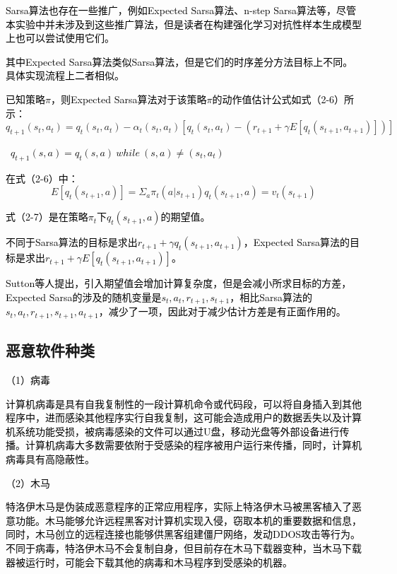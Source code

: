 \textcolor{black}{Sarsa算法也存在一些推广，例如Expected Sarsa算法、n-step Sarsa算法等，尽管本实验中并未涉及到这些推广算法，但是读者在构建强化学习对抗性样本生成模型上也可以尝试使用它们。}

\textcolor{black}{其中Expected Sarsa算法类似Sarsa算法，但是它们的时序差分方法目标上不同。具体实现流程上二者相似。}

\textcolor{black}{已知策略$\pi$，则Expected Sarsa算法对于该策略$\pi$的动作值估计公式如式（2-6）所示：}
\begin{equation}
q_{t+1}(s_{t},a_{t})=q_{t}(s_{t},a_{t})-\alpha _{t}(s_{t},a_{t})[q_{t}(s_{t},a_{t})-(r_{t+1}+\gamma E[q_{t}(s_{t+1},a_{t+1})])] 
\end{equation}

\textcolor{black}{\ $q_{t+1}(s,a)=q_{t}(s,a) \ while \ (s,a) \neq (s_{t},a_{t})$}

\textcolor{black}{在式（2-6）中：}
\begin{equation}
    E[q_{t}(s_{t+1},a)]=\Sigma_{a}\pi_{t}(a|s_{t+1})q_{t}(s_{t+1},a)=v_{t}(s_{t+1})
\end{equation}

\textcolor{black}{式（2-7）是在策略${\pi}_{t}$下${q}_{t}\left({s}_{{t+1}}{,a} \right)$的期望值。}

\textcolor{black}{不同于Sarsa算法的目标是求出$r_{t+1}+\gamma q_{t}(s_{t+1},a_{t+1})$，Expected Sarsa算法的目标是求出$r_{t+1}+\gamma E[q_{t}(s_{t+1},a_{t+1})]$。}

\textcolor{black}{Sutton等人提出，引入期望值会增加计算复杂度，但是会减小所求目标的方差\cite{ref30}\cite{ref31}\cite{ref32}，Expected Sarsa的涉及的随机变量是${{s}_{t}{,}a_t,r_{t+1},s_{t+1}}$，相比Sarsa算法的${s_t,a_t,r_{t+1},s_{t+1},a_{t+1}}$，减少了一项，因此对于减少估计方差是有正面作用的。}

\subsection{恶意软件种类}

\textcolor{black}{（1）病毒}

\textcolor{black}{计算机病毒是具有自我复制性的一段计算机命令或代码段，可以将自身插入到其他程序中，进而感染其他程序实行自我复制，这可能会造成用户的数据丢失以及计算机系统功能受损，被病毒感染的文件可以通过U盘，移动光盘等外部设备进行传播。计算机病毒大多数需要依附于受感染的程序被用户运行来传播，同时，计算机病毒具有高隐蔽性。}

\textcolor{black}{（2）木马}

\textcolor{black}{特洛伊木马是伪装成恶意程序的正常应用程序，实际上特洛伊木马被黑客植入了恶意功能。木马能够允许远程黑客对计算机实现入侵，窃取本机的重要数据和信息，同时，木马创立的远程连接也能够供黑客组建僵尸网络，发动DDOS攻击等行为。不同于病毒，特洛伊木马不会复制自身，但目前存在木马下载器变种，当木马下载器被运行时，可能会下载其他的病毒和木马程序到受感染的机器。}

